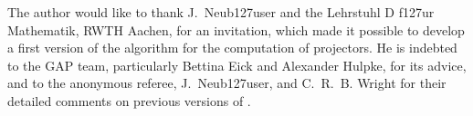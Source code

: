 The author would like to thank J.~Neub\accent127user and the Lehrstuhl D f\accent127ur
Mathematik, RWTH Aachen, for an invitation, which made it possible to develop a first
version of the algorithm for the computation of projectors. He is indebted to the GAP
team, particularly Bettina Eick and Alexander Hulpke, for its advice, and to the
anonymous referee, J.~Neub\accent127user, and C.~R.~B. Wright for their detailed comments
on previous versions of {\CRISP}.


